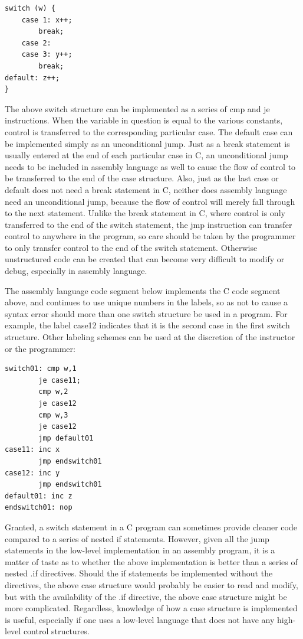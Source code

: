 \documentclass[10pt]{book}
\begin{document}
\begin{verbatim}
switch (w) {
    case 1: x++;
        break;
    case 2:
    case 3: y++;
        break;
default: z++;
}
\end{verbatim}

The above switch structure can be implemented as a series of cmp and je instructions. When the variable in question is equal to the various constants, control is transferred to the corresponding particular case. The default case can be implemented simply as an unconditional jump. Just as a break statement is usually entered at the end of each particular case in C, an unconditional jump needs to be included in assembly language as well to cause the flow of control to be transferred to the end of the case structure. Also, just as the last case or default does not need a break statement in C, neither does assembly language need an unconditional jump, because the flow of control will merely fall through to the next statement. Unlike the break statement in C, where control is only transferred to the end of the switch statement, the jmp instruction can transfer control to anywhere in the program, so care should be taken by the programmer to only transfer control to the end of the switch statement. Otherwise unstructured code can be created that can become very difficult to modify or debug, especially in assembly language.

The assembly language code segment below implements the C code segment above, and continues to use unique numbers in the labels, so as not to cause a syntax error should more than one switch structure be used in a program. For\\
example, the label case12 indicates that it is the second case in the first switch structure. Other labeling schemes can be used at the discretion of the instructor or the programmer:


\begin{verbatim}
switch01: cmp w,1
        je case11;
        cmp w,2
        je case12
        cmp w,3
        je case12
        jmp default01
case11: inc x
        jmp endswitch01
case12: inc y
        jmp endswitch01
default01: inc z
endswitch01: nop
\end{verbatim}

Granted, a switch statement in a C program can sometimes provide cleaner code compared to a series of nested if statements. However, given all the jump statements in the low-level implementation in an assembly program, it is a matter of taste as to whether the above implementation is better than a series of nested .if directives. Should the if statements be implemented without the directives, the above case structure would probably be easier to read and modify, but with the availability of the .if directive, the above case structure might be more complicated. Regardless, knowledge of how a case structure is implemented is useful, especially if one uses a low-level language that does not have any high-level control structures.
\end{document}
